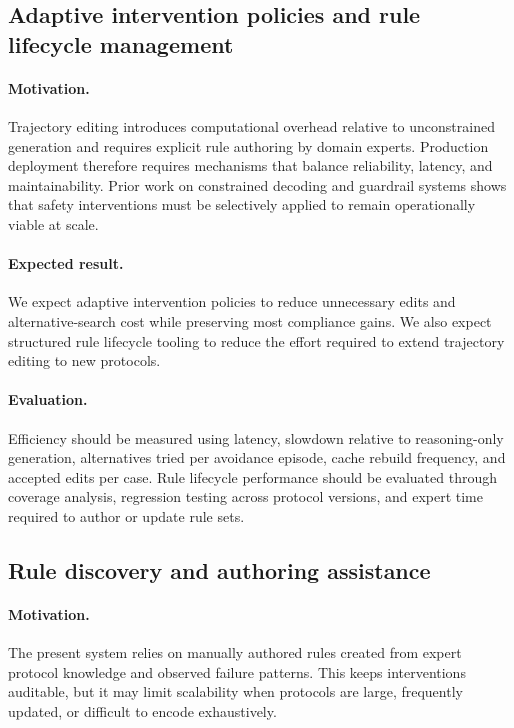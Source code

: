\documentclass[twocolumn]{article}
\begin{document}
\subsection{Adaptive intervention policies and rule lifecycle
management}\label{sec:future_adaptive_policies}

\paragraph{Motivation.}
Trajectory editing introduces computational overhead relative to unconstrained
generation and requires explicit rule authoring by domain experts. Production
deployment therefore requires mechanisms that balance reliability, latency, and
maintainability. Prior work on constrained decoding and guardrail systems shows
that safety interventions must be selectively applied to remain operationally
viable at scale.

\paragraph{Expected result.}
We expect adaptive intervention policies to reduce unnecessary edits and
alternative-search cost while preserving most compliance gains. We also expect
structured rule lifecycle tooling to reduce the effort required to extend
trajectory editing to new protocols.

\paragraph{Evaluation.}
Efficiency should be measured using latency, slowdown relative to reasoning-only
generation, alternatives tried per avoidance episode, cache rebuild frequency,
and accepted edits per case. Rule lifecycle performance should be evaluated
through coverage analysis, regression testing across protocol versions, and
expert time required to author or update rule sets.

\subsection{Rule discovery and authoring assistance}

\paragraph{Motivation.}
The present system relies on manually authored rules created from expert
protocol knowledge and observed failure patterns. This keeps interventions
auditable, but it may limit scalability when protocols are large, frequently
updated, or difficult to encode exhaustively.
\end{document}

